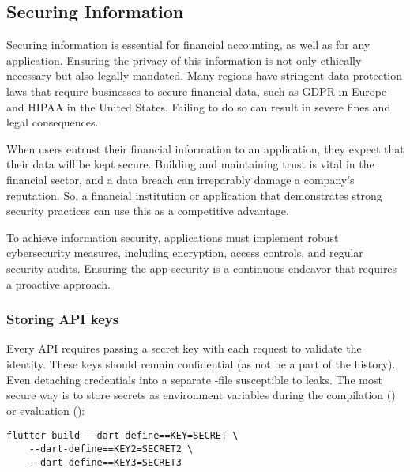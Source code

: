 
\subsection{Securing Information}

Securing information is essential for financial accounting, as well as for any application. Ensuring the privacy 
of this information is not only ethically necessary but also legally mandated. Many regions have stringent data 
protection laws that require businesses to secure financial data, such as GDPR in Europe and HIPAA in the United States.
Failing to do so can result in severe fines and legal consequences.

When users entrust their financial information to an application, they expect that their data will be kept secure. 
Building and maintaining trust is vital in the financial sector, and a data breach can irreparably damage a company's 
reputation. So, a financial institution or application that demonstrates strong security practices can use this as a 
competitive advantage.

To achieve information security, applications must implement robust cybersecurity measures, including encryption, 
access controls, and regular security audits. Ensuring the app security is a continuous endeavor that requires a 
proactive approach.


\subsubsection{Storing API keys}

Every API requires passing a secret key with each request to validate the identity. These keys should remain 
confidential (as not be a part of the  history). Even detaching credentials into a separate -file  
susceptible to leaks. The most secure way is to store secrets as environment variables during the compilation 
() or evaluation ():

\begin{lstlisting}[language=terminal]
flutter build --dart-define==KEY=SECRET \
    --dart-define==KEY2=SECRET2 \
    --dart-define==KEY3=SECRET3
\end{lstlisting}

